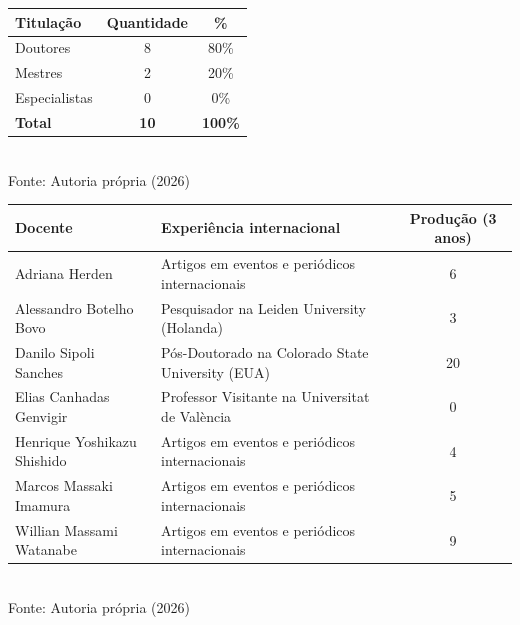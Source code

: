 \begin{quadro}[ht]
\caption{Porcentagem de professores de acordo com sua titulação máxima}
\label{quadro3.2}
\centering
\begin{tabular}{|l|c|c|}
\hline
\textbf{Titulação} & \textbf{Quantidade} & \textbf{\%} \\ \hline
Doutores & 8 & 80\% \\ \hline
Mestres & 2 & 20\% \\ \hline
Especialistas & 0 & 0\% \\ \hline
\textbf{Total} & \textbf{10} & \textbf{100\%} \\ \hline
\end{tabular}
\small \\ Fonte: Autoria própria (2026)
\end{quadro}

\begin{quadro}[ht]
\caption{Experiência internacional e Produção Intelectual/Técnica dos docentes}
\label{quadro3.3}
\centering
\begin{tabular}{|p{4cm}|p{6cm}|c|}
\hline
\textbf{Docente} & \textbf{Experiência internacional} & \textbf{Produção (3 anos)} \\ \hline
Adriana Herden & Artigos em eventos e periódicos internacionais & 6 \\ \hline
Alessandro Botelho Bovo & Pesquisador na Leiden University (Holanda) & 3 \\ \hline
Danilo Sipoli Sanches & Pós-Doutorado na Colorado State University (EUA) & 20 \\ \hline
Elias Canhadas Genvigir & Professor Visitante na Universitat de València & 0 \\ \hline
Henrique Yoshikazu Shishido & Artigos em eventos e periódicos internacionais & 4 \\ \hline
Marcos Massaki Imamura & Artigos em eventos e periódicos internacionais & 5 \\ \hline
Willian Massami Watanabe & Artigos em eventos e periódicos internacionais & 9 \\ \hline
\end{tabular}
\small \\ Fonte: Autoria própria (2026)
\end{quadro}

